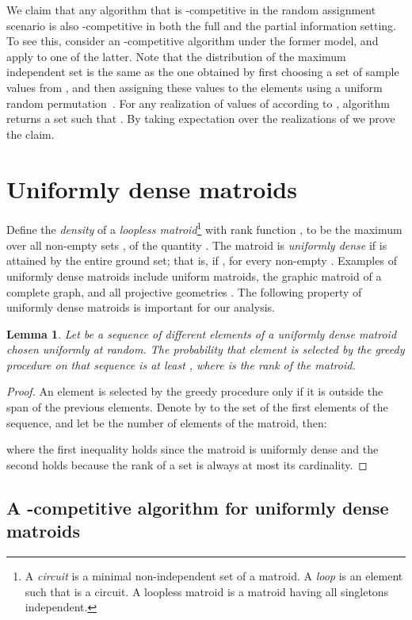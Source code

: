 \documentclass[letterpaper,11pt]{article}
\newtheorem{lem}[thm]{Lemma}
\theoremstyle{definition}
\theoremstyle{remark}
\begin{document}
We claim that any algorithm that is -competitive in the random assignment scenario is also -competitive in both the full and the partial information setting. To see this, consider an -competitive algorithm  under the former model, and apply to one of the latter. Note that the distribution of the maximum independent set is the same as the one obtained by first choosing a set  of  sample values from , and then assigning these values to the elements using a uniform random permutation~. For any realization of values of  according to , algorithm  returns a set  such that . By taking expectation over the realizations of  we prove the claim.

\section{Uniformly dense matroids}\label{section3}
Define the \emph{density}  of a \emph{loopless matroid}\footnote{A \emph{circuit} is a minimal non-independent set of a matroid. A \emph{loop} is an element  such that  is a circuit. A loopless matroid is a matroid having all singletons independent. }  with rank function , to be the maximum over all non-empty sets , of the quantity .
The matroid  is \emph{uniformly dense} if  is attained by the entire ground set; that is, if , for every non-empty . Examples of uniformly dense matroids include uniform matroids, the graphic matroid of a complete graph, and all projective geometries . The following property of uniformly dense matroids is important for our analysis.
\begin{lem}\label{lem:randomgreedy}
Let  be a sequence of different elements of a uniformly dense matroid chosen uniformly at random. The probability that element  is selected by the greedy procedure on that sequence is at least , where  is the rank of the matroid.
\end{lem}
\begin{proof}
An element is selected by the greedy procedure only if it is outside the span of the previous elements. Denote by  to the set of the first  elements of the sequence, and let  be the number of elements of the matroid, then:
  
  where the first inequality holds since the matroid is uniformly dense and the second holds because the rank of a set is always at most its cardinality.
\end{proof}

\subsection{A -competitive algorithm for uniformly dense matroids}
\end{document}
